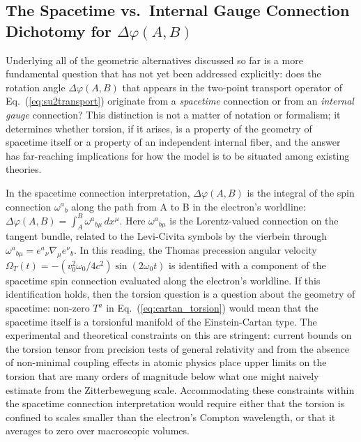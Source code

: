 \documentclass[%
 reprint,
 amsmath,amssymb,
 aps,
 prb,
]{revtex4-2}
\numberwithin{equation}{section}
\newcommand{\OmT}{\Omega_{T}}
\begin{document}
\subsection{The Spacetime vs.\ Internal Gauge Connection Dichotomy for $\Delta\varphi(A,B)$}
\label{sec:dichotomy}

Underlying all of the geometric alternatives discussed so far is a more fundamental question that has not yet been addressed explicitly: does the rotation angle $\Delta\varphi(A,B)$ that appears in the two-point transport operator of Eq.~(\ref{eq:su2transport}) originate from a \emph{spacetime} connection or from an \emph{internal gauge} connection? This distinction is not a matter of notation or formalism; it determines whether torsion, if it arises, is a property of the geometry of spacetime itself or a property of an independent internal fiber, and the answer has far-reaching implications for how the model is to be situated among existing theories.

In the spacetime connection interpretation, $\Delta\varphi(A,B)$ is the integral of the spin connection $\omega^a{}_b$ along the path from A to B in the electron's worldline: $\Delta\varphi(A,B) = \int_A^B \omega^a{}_{b\mu}\,dx^\mu$. Here $\omega^a{}_{b\mu}$ is the Lorentz-valued connection on the tangent bundle, related to the Levi-Civita symbols by the vierbein through $\omega^a{}_{b\mu} = e^a{}_\nu \nabla_\mu e^\nu{}_b$. In this reading, the Thomas precession angular velocity $\OmT(t) = -(v_0^2\omega_0/4c^2)\sin(2\omega_0 t)$ is identified with a component of the spacetime spin connection evaluated along the electron's worldline. If this identification holds, then the torsion question is a question about the geometry of spacetime: non-zero $T^a$ in Eq.~(\ref{eq:cartan_torsion}) would mean that the spacetime itself is a torsionful manifold of the Einstein-Cartan type. The experimental and theoretical constraints on this are stringent: current bounds on the torsion tensor from precision tests of general relativity and from the absence of non-minimal coupling effects in atomic physics place upper limits on the torsion that are many orders of magnitude below what one might naively estimate from the Zitterbewegung scale. Accommodating these constraints within the spacetime connection interpretation would require either that the torsion is confined to scales smaller than the electron's Compton wavelength, or that it averages to zero over macroscopic volumes.
\end{document}
